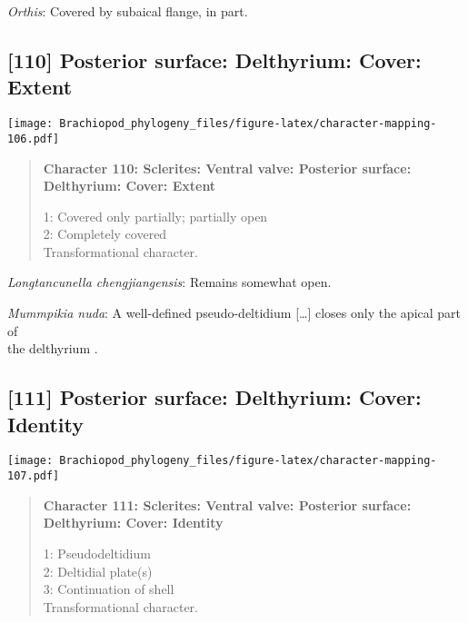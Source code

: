 \documentclass[openany]{book}
\theoremstyle{definition}
\theoremstyle{definition}
\theoremstyle{definition}
\theoremstyle{remark}
\begin{document}
\hypertarget{Orthis-coding-109}{}
\emph{Orthis}: Covered by subaical flange, in part.

\subsection*{{[}110{]} Posterior surface: Delthyrium: Cover:
Extent}\label{posterior-surface-delthyrium-cover-extent}

\texttt{[image: Brachiopod\_phylogeny\_files/figure-latex/character-mapping-106.pdf]}

\begin{quote}
\textbf{Character 110: Sclerites: Ventral valve: Posterior surface:
Delthyrium: Cover: Extent}

1: Covered only partially; partially open\\
2: Completely covered\\
Transformational character.
\end{quote}

\hypertarget{Longtancunella_chengjiangensis-coding-110}{}
\emph{Longtancunella chengjiangensis}: Remains somewhat open.

\hypertarget{Mummpikia_nuda-coding-110}{}
\emph{Mummpikia nuda}: A well-defined pseudo-deltidium {[}\ldots{}{]}
closes only the apical part of\\
the delthyrium \citep{Rowell1985Theevolutionary}.

\subsection*{{[}111{]} Posterior surface: Delthyrium: Cover:
Identity}\label{posterior-surface-delthyrium-cover-identity}

\texttt{[image: Brachiopod\_phylogeny\_files/figure-latex/character-mapping-107.pdf]}

\begin{quote}
\textbf{Character 111: Sclerites: Ventral valve: Posterior surface:
Delthyrium: Cover: Identity}

1: Pseudodeltidium\\
2: Deltidial plate(s)\\
3: Continuation of shell\\
Transformational character.
\end{quote}
\end{document}
